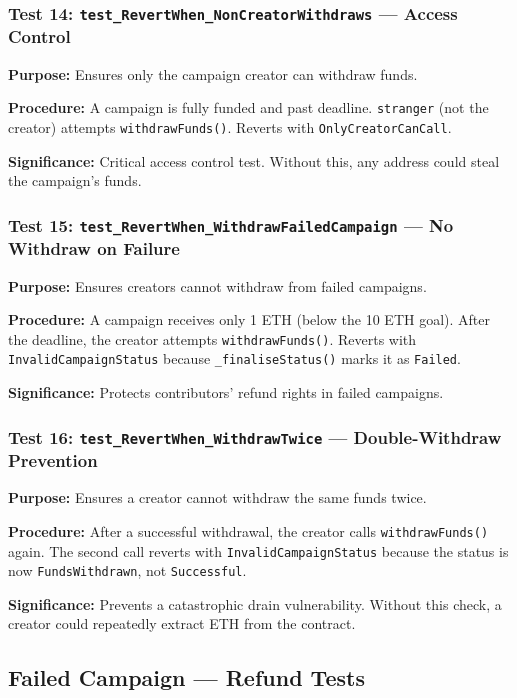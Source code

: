 \subsubsection{Test 14: \texttt{test\_RevertWhen\_NonCreatorWithdraws} --- Access Control}

\textbf{Purpose:} Ensures only the campaign creator can withdraw funds.

\textbf{Procedure:} A campaign is fully funded and past deadline. \texttt{stranger} (not the creator) attempts \texttt{withdrawFunds()}. Reverts with \texttt{OnlyCreatorCanCall}.

\textbf{Significance:} Critical access control test. Without this, any address could steal the campaign's funds.

\subsubsection{Test 15: \texttt{test\_RevertWhen\_WithdrawFailedCampaign} --- No Withdraw on Failure}

\textbf{Purpose:} Ensures creators cannot withdraw from failed campaigns.

\textbf{Procedure:} A campaign receives only 1 ETH (below the 10 ETH goal). After the deadline, the creator attempts \texttt{withdrawFunds()}. Reverts with \texttt{InvalidCampaignStatus} because \texttt{\_finaliseStatus()} marks it as \texttt{Failed}.

\textbf{Significance:} Protects contributors' refund rights in failed campaigns.

\subsubsection{Test 16: \texttt{test\_RevertWhen\_WithdrawTwice} --- Double-Withdraw Prevention}

\textbf{Purpose:} Ensures a creator cannot withdraw the same funds twice.

\textbf{Procedure:} After a successful withdrawal, the creator calls \texttt{withdrawFunds()} again. The second call reverts with \texttt{InvalidCampaignStatus} because the status is now \texttt{FundsWithdrawn}, not \texttt{Successful}.

\textbf{Significance:} Prevents a catastrophic drain vulnerability. Without this check, a creator could repeatedly extract ETH from the contract.

\subsection{Failed Campaign --- Refund Tests}

